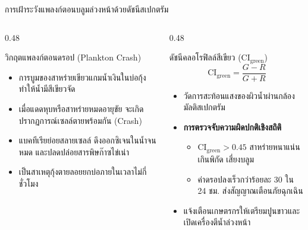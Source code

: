 \documentclass[aspectratio=169, 10pt]{beamer}
\begin{document}
\begin{frame}{การเฝ้าระวังแพลงก์ตอนบลูมล่วงหน้าด้วยดัชนีสเปกตรัม}
\begin{columns}[T]
    \begin{column}{0.48\textwidth}
        \begin{mastercard}{วิกฤตแพลงก์ตอนดรอป (Plankton Crash)}
            \begin{itemize}
                \item การบูมของสาหร่ายเขียวแกมน้ำเงินในบ่อกุ้ง ทำให้น้ำมีสีเขียวจัด
                \item เมื่อแดดหุบหรือสาหร่ายหมดอายุขัย จะเกิดปรากฏการณ์เซลล์ตายพร้อมกัน (Crash)
                \item แบคทีเรียย่อยสลายเซลล์ ดึงออกซิเจนในน้ำจนหมด และปลดปล่อยสารพิษก๊าซไข่เน่า
                \item เป็นสาเหตุกุ้งตายลอยยกบ่อภายในเวลาไม่กี่ชั่วโมง
            \end{itemize}
        \end{mastercard}
    \end{column}
    \begin{column}{0.48\textwidth}
        \begin{aquacard}{ดัชนีคลอโรฟิลล์สีเขียว ($\text{CI}_{\text{green}}$)}
            \begin{equation*}
                \text{CI}_{\text{green}} = \frac{G - R}{G + R}
            \end{equation*}
            \begin{itemize}
                \item วัดการสะท้อนแสงของผิวน้ำผ่านกล้องมัลติสเปกตรัม
                \item \textbf{การตรวจจับความผิดปกติเชิงสถิติ}
                \begin{itemize}
                    \item $\text{CI}_{\text{green}} > 0.45$ สาหร่ายหนาแน่นเกินพิกัด เสี่ยงบลูม
                    \item ค่าดรอปลงเร็วกว่าร้อยละ 30 ใน 24 ชม. ส่งสัญญาณเตือนภัยฉุกเฉิน
                \end{itemize}
                \item แจ้งเตือนเกษตรกรให้เตรียมปูนขาวและเปิดเครื่องตีน้ำล่วงหน้า
            \end{itemize}
        \end{aquacard}
    \end{column}
\end{columns}
\end{frame}
\end{document}
